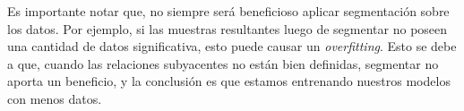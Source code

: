         Es importante notar que, no siempre será beneficioso aplicar segmentación sobre los datos. Por ejemplo, si las muestras resultantes luego de segmentar no poseen una cantidad de datos significativa, esto puede causar un \emph{overfitting}. Esto se debe a que, cuando las relaciones subyacentes no están bien definidas, segmentar no aporta un beneficio, y la conclusión es que estamos entrenando nuestros modelos con menos datos.